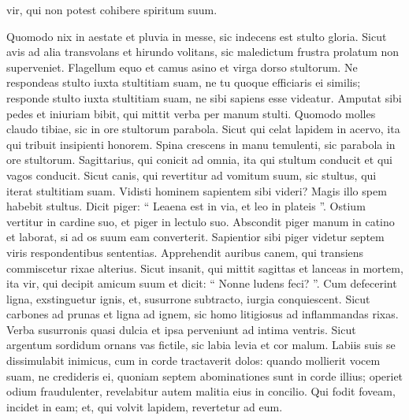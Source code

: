 \begin{biblechapter}
\begin{biblechapter}
\begin{biblechapter}
\begin{biblechapter}
\begin{biblechapter}
\begin{biblechapter}
\begin{biblechapter}
\begin{biblechapter}
\begin{biblechapter}
\begin{biblechapter}
\begin{biblechapter}
\begin{biblechapter}
\begin{biblechapter}
\begin{biblechapter}
\begin{biblechapter}
\begin{biblechapter}
\begin{biblechapter}
\begin{biblechapter}
\begin{biblechapter}
\begin{biblechapter}
\begin{biblechapter}
\begin{biblechapter}
\begin{biblechapter}
\begin{biblechapter}
\begin{biblechapter}
 vir, qui non potest cohibere spiritum suum.
 
\begin{biblechapter}
 \verse Quomodo nix in aestate et pluvia in messe,
 sic indecens est stulto gloria.
 \verse Sicut avis ad alia transvolans et hirundo volitans,
 sic maledictum frustra prolatum non superveniet.
 \verse Flagellum equo et camus asino
 et virga dorso stultorum.
 \verse Ne respondeas stulto iuxta stultitiam suam,
 ne tu quoque efficiaris ei similis;
 \verse responde stulto iuxta stultitiam suam,
 ne sibi sapiens esse videatur.
 \verse Amputat sibi pedes et iniuriam bibit,
 qui mittit verba per manum stulti.
 \verse Quomodo molles claudo tibiae,
 sic in ore stultorum parabola.
 \verse Sicut qui celat lapidem in acervo,
 ita qui tribuit insipienti honorem.
 \verse Spina crescens in manu temulenti,
 sic parabola in ore stultorum.
 \verse Sagittarius, qui conicit ad omnia,
 ita qui stultum conducit et qui vagos conducit.
 \verse Sicut canis, qui revertitur ad vomitum suum,
 sic stultus, qui iterat stultitiam suam.
 \verse Vidisti hominem sapientem sibi videri?
 Magis illo spem habebit stultus.
 \verse Dicit piger: “ Leaena est in via,
 et leo in plateis ”.
 \verse Ostium vertitur in cardine suo,
 et piger in lectulo suo.
 \verse Abscondit piger manum in catino
 et laborat, si ad os suum eam converterit.
 \verse Sapientior sibi piger videtur
 septem viris respondentibus sententias.
 \verse Apprehendit auribus canem,
 qui transiens commiscetur rixae alterius.
 \verse Sicut insanit, qui mittit sagittas
 et lanceas in mortem,
 \verse ita vir, qui decipit amicum suum
 et dicit: “ Nonne ludens feci? ”.
 \verse Cum defecerint ligna, exstinguetur ignis,
 et, susurrone subtracto, iurgia conquiescent.
 \verse Sicut carbones ad prunas et ligna ad ignem,
 sic homo litigiosus ad inflammandas rixas.
 \verse Verba susurronis quasi dulcia
 et ipsa perveniunt ad intima ventris.
 \verse Sicut argentum sordidum ornans vas fictile,
 sic labia levia et cor malum.
 \verse Labiis suis se dissimulabit inimicus,
 cum in corde tractaverit dolos:
 \verse quando mollierit vocem suam, ne credideris ei,
 quoniam septem abominationes sunt in corde illius;
 \verse operiet odium fraudulenter,
 revelabitur autem malitia eius in concilio.
 \verse Qui fodit foveam, incidet in eam;
 et, qui volvit lapidem, revertetur ad eum.

\end{biblechapter}
\end{biblechapter}
\end{biblechapter}
\end{biblechapter}
\end{biblechapter}
\end{biblechapter}
\end{biblechapter}
\end{biblechapter}
\end{biblechapter}
\end{biblechapter}
\end{biblechapter}
\end{biblechapter}
\end{biblechapter}
\end{biblechapter}
\end{biblechapter}
\end{biblechapter}
\end{biblechapter}
\end{biblechapter}
\end{biblechapter}
\end{biblechapter}
\end{biblechapter}
\end{biblechapter}
\end{biblechapter}
\end{biblechapter}
\end{biblechapter}
\end{biblechapter}
